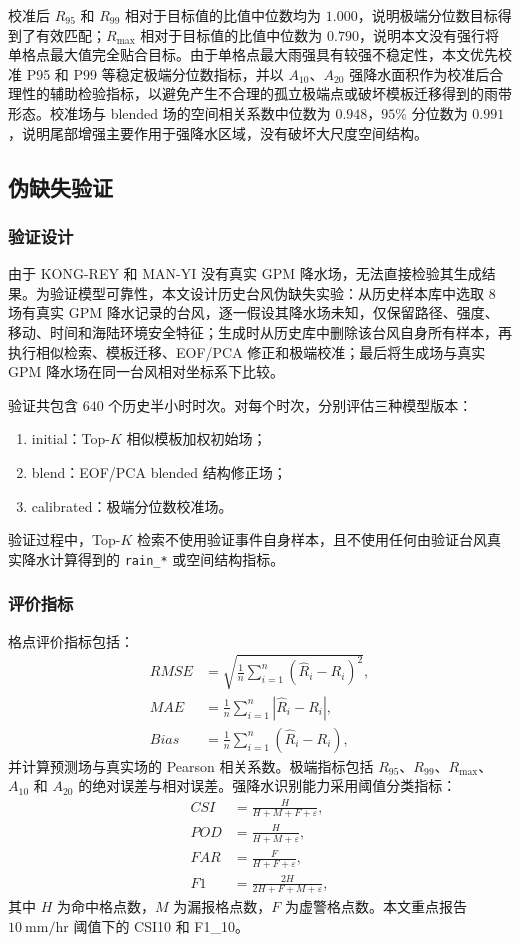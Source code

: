 \documentclass[UTF8,a4paper,zihao=5]{ctexart}
\numberwithin{equation}{section}
\numberwithin{figure}{section}
\numberwithin{table}{section}
\begin{document}
校准后 $R_{95}$ 和 $R_{99}$ 相对于目标值的比值中位数均为 $1.000$，说明极端分位数目标得到了有效匹配；$R_{\max}$ 相对于目标值的比值中位数为 $0.790$，说明本文没有强行将单格点最大值完全贴合目标。由于单格点最大雨强具有较强不稳定性，本文优先校准 P95 和 P99 等稳定极端分位数指标，并以 $A_{10}$、$A_{20}$ 强降水面积作为校准后合理性的辅助检验指标，以避免产生不合理的孤立极端点或破坏模板迁移得到的雨带形态。校准场与 blended 场的空间相关系数中位数为 $0.948$，$95\%$ 分位数为 $0.991$，说明尾部增强主要作用于强降水区域，没有破坏大尺度空间结构。

\subsection{伪缺失验证}

\subsubsection{验证设计}

由于 KONG-REY 和 MAN-YI 没有真实 GPM 降水场，无法直接检验其生成结果。为验证模型可靠性，本文设计历史台风伪缺失实验：从历史样本库中选取 $8$ 场有真实 GPM 降水记录的台风，逐一假设其降水场未知，仅保留路径、强度、移动、时间和海陆环境安全特征；生成时从历史库中删除该台风自身所有样本，再执行相似检索、模板迁移、EOF/PCA 修正和极端校准；最后将生成场与真实 GPM 降水场在同一台风相对坐标系下比较。

验证共包含 $640$ 个历史半小时时次。对每个时次，分别评估三种模型版本：
\begin{enumerate}
    \item initial：Top-$K$ 相似模板加权初始场；
    \item blend：EOF/PCA blended 结构修正场；
    \item calibrated：极端分位数校准场。
\end{enumerate}
验证过程中，Top-$K$ 检索不使用验证事件自身样本，且不使用任何由验证台风真实降水计算得到的 \texttt{rain\_*} 或空间结构指标。

\subsubsection{评价指标}

格点评价指标包括：
\begin{align}
RMSE &= \sqrt{\frac{1}{n}\sum_{i=1}^{n}(\hat R_i-R_i)^2},\\
MAE &= \frac{1}{n}\sum_{i=1}^{n}|\hat R_i-R_i|,\\
Bias &= \frac{1}{n}\sum_{i=1}^{n}(\hat R_i-R_i),
\end{align}
并计算预测场与真实场的 Pearson 相关系数。极端指标包括 $R_{95}$、$R_{99}$、$R_{\max}$、$A_{10}$ 和 $A_{20}$ 的绝对误差与相对误差。强降水识别能力采用阈值分类指标：
\begin{align}
CSI &= \frac{H}{H+M+F+\varepsilon},\\
POD &= \frac{H}{H+M+\varepsilon},\\
FAR &= \frac{F}{H+F+\varepsilon},\\
F1 &= \frac{2H}{2H+F+M+\varepsilon},
\end{align}
其中 $H$ 为命中格点数，$M$ 为漏报格点数，$F$ 为虚警格点数。本文重点报告 $10\ \mathrm{mm/hr}$ 阈值下的 CSI10 和 F1\_10。
\end{document}
